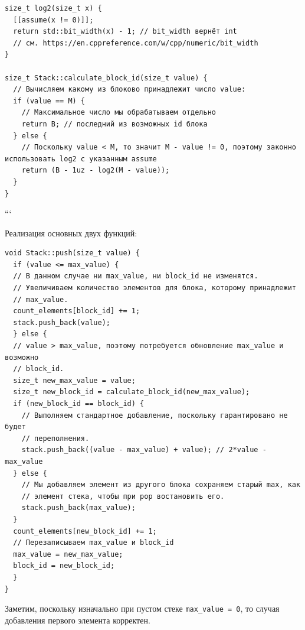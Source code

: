 \begin{verbatim}
size_t log2(size_t x) {
  [[assume(x != 0)]];
  return std::bit_width(x) - 1; // bit_width вернёт int
  // см. https://en.cppreference.com/w/cpp/numeric/bit_width
}

size_t Stack::calculate_block_id(size_t value) {
  // Вычисляем какому из блоково принадлежит число value:
  if (value == M) {
    // Максимальное число мы обрабатываем отдельно
    return B; // последний из возможных id блока
  } else {
    // Поскольку value < M, то значит M - value != 0, поэтому законно использовать log2 с указанным assume
    return (B - 1uz - log2(M - value));
  }
}
\end{verbatim}
```

Реализация основных двух функций:
\begin{verbatim}
void Stack::push(size_t value) {
  if (value <= max_value) {
  // В данном случае ни max_value, ни block_id не изменятся.
  // Увеличиваем количество элементов для блока, которому принадлежит
  // max_value.
  count_elements[block_id] += 1;
  stack.push_back(value);
  } else {
  // value > max_value, поэтому потребуется обновление max_value и возможно
  // block_id.
  size_t new_max_value = value;
  size_t new_block_id = calculate_block_id(new_max_value);
  if (new_block_id == block_id) {
    // Выполняем стандартное добавление, поскольку гарантировано не будет
    // переполнения.
    stack.push_back((value - max_value) + value); // 2*value - max_value
  } else {
    // Мы добавляем элемент из другого блока сохраняем старый max, как
    // элемент стека, чтобы при pop востановить его.
    stack.push_back(max_value);
  }
  count_elements[new_block_id] += 1;
  // Перезаписываем max_value и block_id
  max_value = new_max_value;
  block_id = new_block_id;
  }
}
\end{verbatim}
Заметим, поскольку изначально при пустом стеке \texttt{max_value = 0}, то случая добавления первого элемента корректен.
